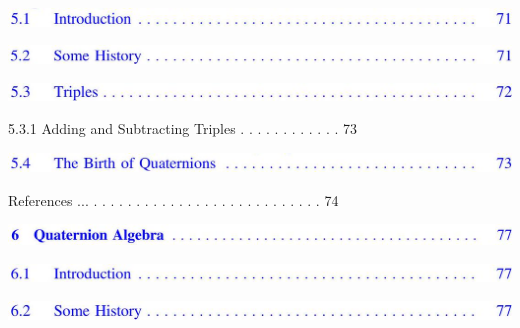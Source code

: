 \documentclass[10pt]{article}
\begin{document}
\begin{center}
\includegraphics[max width=\textwidth]{2023_04_20_41f1ceac5a31dc7d1b59g-011(8)}
\end{center}

\begin{center}
\includegraphics[max width=\textwidth]{2023_04_20_41f1ceac5a31dc7d1b59g-011(7)}
\end{center}

\begin{center}
\includegraphics[max width=\textwidth]{2023_04_20_41f1ceac5a31dc7d1b59g-011(10)}
\end{center}

5.3.1 Adding and Subtracting Triples . . . . . . . . . . . . 73

\begin{center}
\includegraphics[max width=\textwidth]{2023_04_20_41f1ceac5a31dc7d1b59g-011(9)}
\end{center}

References ... . . . . . . . . . . . . . . . . . . . . . . . . . . . 74

\begin{center}
\includegraphics[max width=\textwidth]{2023_04_20_41f1ceac5a31dc7d1b59g-011(4)}
\end{center}

\begin{center}
\includegraphics[max width=\textwidth]{2023_04_20_41f1ceac5a31dc7d1b59g-011(15)}
\end{center}

\begin{center}
\includegraphics[max width=\textwidth]{2023_04_20_41f1ceac5a31dc7d1b59g-011(12)}
\end{center}
\end{document}
